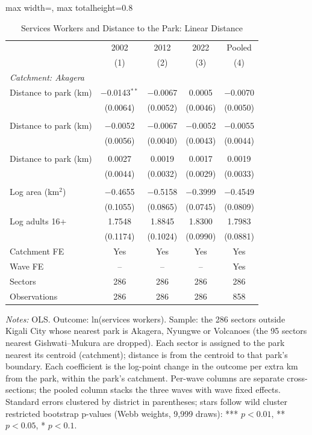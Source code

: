\documentclass[11pt]{article}
\begin{document}
\begin{table}[H]
\centering\footnotesize\setlength{\tabcolsep}{4pt}
\caption{Services Workers and Distance to the Park: Linear Distance}
\label{tab:main_linear_ln_services}
\begin{adjustbox}{max width=\textwidth, max totalheight=0.8\textheight}
\begin{tabular}{lcccc}
\toprule
 & 2002 & 2012 & 2022 & Pooled \\
 & (1) & (2) & (3) & (4) \\
\midrule
\multicolumn{5}{l}{\textit{Catchment: Akagera}} \\
\quad Distance to park (km) & $-$0.0143$^{**}$ & $-$0.0067 & 0.0005 & $-$0.0070 \\
 & (0.0064) & (0.0052) & (0.0046) & (0.0050) \\
\addlinespace
\multicolumn{5}{l}{\textit{Catchment: Nyungwe}} \\
\quad Distance to park (km) & $-$0.0052 & $-$0.0067 & $-$0.0052 & $-$0.0055 \\
 & (0.0056) & (0.0040) & (0.0043) & (0.0044) \\
\addlinespace
\multicolumn{5}{l}{\textit{Catchment: Volcanoes}} \\
\quad Distance to park (km) & 0.0027 & 0.0019 & 0.0017 & 0.0019 \\
 & (0.0044) & (0.0032) & (0.0029) & (0.0033) \\
\addlinespace
\multicolumn{5}{l}{\textit{Controls}} \\
\quad Log area (km$^2$) & $-$0.4655 & $-$0.5158 & $-$0.3999 & $-$0.4549 \\
 & (0.1055) & (0.0865) & (0.0745) & (0.0809) \\
\quad Log adults 16+ & 1.7548 & 1.8845 & 1.8300 & 1.7983 \\
 & (0.1174) & (0.1024) & (0.0990) & (0.0881) \\
\midrule
Catchment FE & Yes & Yes & Yes & Yes \\
Wave FE & -- & -- & -- & Yes \\
Sectors & 286 & 286 & 286 & 286 \\
Observations & 286 & 286 & 286 & 858 \\
\bottomrule
\end{tabular}
\end{adjustbox}
\begin{minipage}{0.97\textwidth}\scriptsize
\textit{Notes:} OLS. Outcome: ln(services workers). Sample: the 286 sectors outside Kigali City whose nearest park is Akagera, Nyungwe or Volcanoes (the 95 sectors nearest Gishwati--Mukura are dropped). Each sector is assigned to the park nearest its centroid (catchment); distance is from the centroid to that park's boundary. Each coefficient is the log-point change in the outcome per extra km from the park, within the park's catchment. Per-wave columns are separate cross-sections; the pooled column stacks the three waves with wave fixed effects. Standard errors clustered by district in parentheses; stars follow wild cluster restricted bootstrap p-values (Webb weights, 9,999 draws): *** $p<0.01$, ** $p<0.05$, * $p<0.1$.
\end{minipage}
\end{table}
\end{document}
